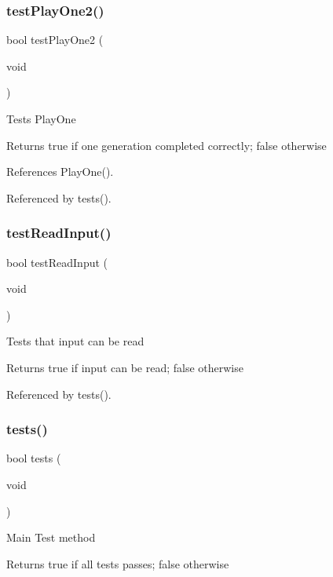 \subsubsection{test\+Play\+One2()}
{\footnotesize\ttfamily bool test\+Play\+One2 (\begin{DoxyParamCaption}\item[{void}]{ }\end{DoxyParamCaption})}

Tests Play\+One \begin{DoxyReturn}{Returns}
true if one generation completed correctly; false otherwise 
\end{DoxyReturn}


References Play\+One().



Referenced by tests().

\mbox{\label{tests_8c_aa89f64db87aebe77bd891e2894595e4e}} 
\subsubsection{test\+Read\+Input()}
{\footnotesize\ttfamily bool test\+Read\+Input (\begin{DoxyParamCaption}\item[{void}]{ }\end{DoxyParamCaption})}

Tests that input can be read \begin{DoxyReturn}{Returns}
true if input can be read; false otherwise 
\end{DoxyReturn}


Referenced by tests().

\mbox{\label{tests_8c_a5e6e6e78df62797046c9ea173550a68a}} 
\subsubsection{tests()}
{\footnotesize\ttfamily bool tests (\begin{DoxyParamCaption}\item[{void}]{ }\end{DoxyParamCaption})}

Main Test method \begin{DoxyReturn}{Returns}
true if all tests passes; false otherwise 
\end{DoxyReturn}


